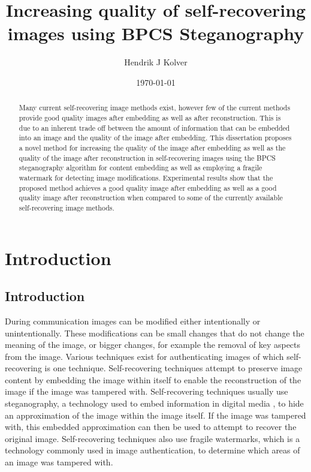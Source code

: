 \documentclass[12pt]{article}
\title{Increasing quality of self-recovering images using BPCS Steganography}
\author{Hendrik J Kolver}
\date{\today}
\begin{document}
\maketitle

\begin{abstract}

\noindent 
Many current self-recovering image methods exist, however few of the current methods provide good quality images after embedding as well as after reconstruction.
This is due to an inherent trade off between the amount of information that can be embedded into an image and the quality of the image after embedding.
This dissertation proposes a novel method for increasing the quality of the image after embedding as well as the quality of the image after reconstruction in self-recovering images using the BPCS steganography algorithm for content embedding as well as employing a fragile watermark for detecting image modifications.
Experimental results show that the proposed method achieves a good quality image after embedding as well as a good quality image after reconstruction when compared to some of the currently available self-recovering image methods. 

\end{abstract}

\tableofcontents
\section{Introduction}

\subsection{Introduction}
During communication images can be modified either intentionally or unintentionally.  These modifications can be small changes that do not change the meaning of the image, or bigger changes, for example the removal of key aspects from the image. 
Various techniques exist for authenticating images of which self-recovering is one technique. 
Self-recovering techniques attempt to preserve image content by embedding the image within itself to enable the reconstruction of the image if the image was tampered with. Self-recovering techniques usually use steganography, a technology used to embed information in digital media \cite{johnson1998exploring}, to hide an approximation of the image within the image itself.  
If the image was tampered with, this embedded approximation can then be used to attempt to recover the original image.
 Self-recovering techniques also use fragile watermarks, which is a technology commonly used in image authentication, to determine which areas of an image was tampered with.
\end{document}
